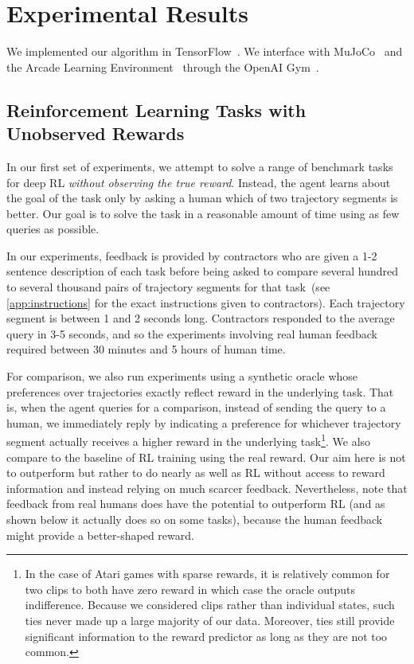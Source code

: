 \documentclass{article}
\begin{document}
\section{Experimental Results}
\label{sec:experiments}

We implemented our algorithm in TensorFlow~\citep{Abadi16}.
We interface with MuJoCo~\citep{Todorov12} and the Arcade Learning Environment~\citep{Bellemare13}
through the OpenAI Gym~\citep{Brockman16}.


\subsection{Reinforcement Learning Tasks with Unobserved Rewards}

In our first set of experiments, we attempt to solve a range of benchmark tasks for deep RL \emph{without observing the true reward}.
Instead, the agent learns about the goal of the task only by asking a human which of two trajectory segments is better.
Our goal is to solve the task in a reasonable amount of time using as few queries as possible.

In our experiments, feedback is provided by contractors
who are given a 1-2 sentence description of each task
before being asked to compare several hundred to several thousand pairs of trajectory segments
for that task~(see \autoref{app:instructions} for the exact instructions given to contractors).
Each trajectory segment is between 1 and 2 seconds long.
Contractors responded to the average query in 3-5 seconds,
and so the experiments involving real human feedback
required between 30 minutes and 5 hours of human time.

For comparison, we also run experiments using a synthetic oracle
whose preferences over trajectories exactly reflect reward in the underlying task.
That is, when the agent queries for a comparison,
instead of sending the query to a human, we immediately reply by indicating a preference for
whichever trajectory segment actually receives a higher reward in the underlying task\footnote{In the case of Atari games
with sparse rewards, it is relatively common for two clips to both have zero reward in which case
the oracle outputs indifference.
Because we considered clips rather than individual states,
such ties never made up a large majority of our data.
Moreover, ties still provide significant information to the reward predictor as long as they are not too common.}.
We also compare to the baseline of RL training using the real reward.
Our aim here is not to outperform but rather to do nearly as well as RL
without access to reward information and instead relying on much scarcer feedback.
Nevertheless, note that feedback from real humans does have the potential to outperform RL
(and as shown below it actually does so on some tasks),
because the human feedback might provide a better-shaped reward.
\end{document}
